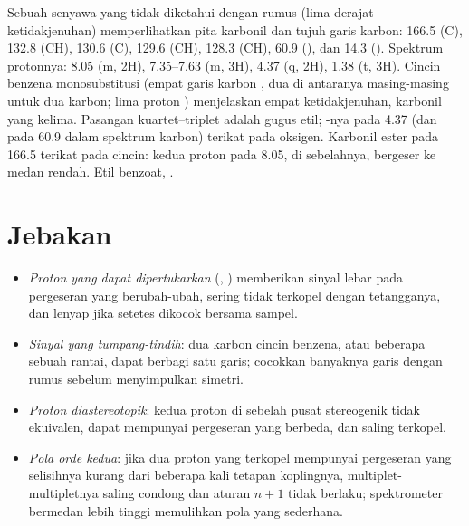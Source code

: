 \begin{example}\label{ex:b2:structure-determination:ester}
Sebuah senyawa yang tidak diketahui dengan rumus  (lima derajat
ketidakjenuhan) memperlihatkan pita karbonil dan tujuh garis karbon: 166.5
(C), 132.8 (CH), 130.6 (C), 129.6 (CH), 128.3 (CH), 60.9 (), dan
14.3 (). Spektrum protonnya: 8.05 (m, 2H), 7.35--7.63 (m, 3H), 4.37
(q, 2H), 1.38 (t, 3H). Cincin benzena monosubstitusi (empat garis karbon
, dua di antaranya masing-masing untuk dua karbon; lima proton
) menjelaskan empat ketidakjenuhan, karbonil yang kelima. Pasangan
kuartet--triplet adalah gugus etil; -nya pada 4.37 (dan pada 60.9
dalam spektrum karbon) terikat pada oksigen. Karbonil ester pada 166.5
terikat pada cincin: kedua proton pada 8.05, di sebelahnya, bergeser ke
medan rendah. Etil benzoat, .
\end{example}

\section{Jebakan}

\begin{itemize}
  \item \emph{Proton yang dapat dipertukarkan} (, )
        memberikan sinyal lebar pada pergeseran yang berubah-ubah, sering
        tidak terkopel dengan tetangganya, dan lenyap jika setetes
         dikocok bersama sampel.
  \item \emph{Sinyal yang tumpang-tindih}: dua karbon cincin benzena, atau
        beberapa  sebuah rantai, dapat berbagi satu garis;
        cocokkan banyaknya garis dengan rumus sebelum menyimpulkan simetri.
  \item \emph{Proton diastereotopik}: kedua proton  di sebelah
        pusat stereogenik tidak ekuivalen, dapat mempunyai pergeseran yang
        berbeda, dan saling terkopel.
  \item \emph{Pola orde kedua}: jika dua proton yang terkopel mempunyai
        pergeseran yang selisihnya kurang dari beberapa kali tetapan
        koplingnya, multiplet-multipletnya saling condong dan aturan
        $n+1$ tidak berlaku; spektrometer bermedan lebih tinggi memulihkan
        pola yang sederhana.
\end{itemize}

